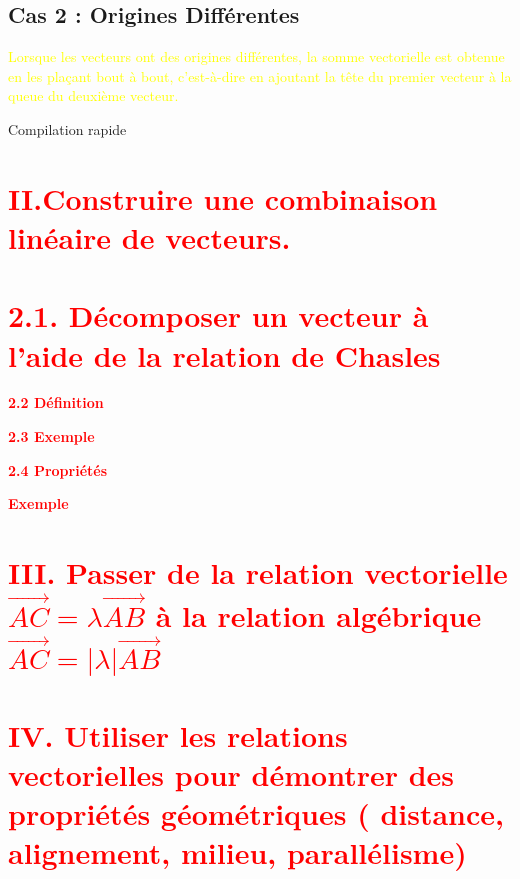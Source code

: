 \documentclass[12pt]{article}
\begin{document}
\subsection*{Cas 2 : Origines Différentes}

\textcolor{yellow}{Lorsque les vecteurs ont des origines différentes, la somme vectorielle est obtenue en les plaçant bout à bout, c'est-à-dire en ajoutant la tête du premier vecteur à la queue du deuxième vecteur.}
\begin{center}
Compilation rapide
\end{center}
\begin{center}
\end{center}
\section*{\textcolor{red}{\textbf{II.Construire une combinaison linéaire de vecteurs.}}}
\section*{\textcolor{red}{\textbf{2.1. Décomposer un vecteur à l’aide de la relation de Chasles}}}

\textcolor{red}{\textbf{2.2 Définition}}

\textcolor{red}{\textbf{2.3 Exemple}}

\textcolor{red}{\textbf{2.4 Propriétés}}

\textcolor{red}{\textbf{Exemple}}

\section*{\textcolor{red}{\textbf{III. Passer de la relation vectorielle $\vec{AC}=\lambda \vec{AB}$ à la relation algébrique $\vec{AC}=|\lambda|\vec{AB}$}}}
\section*{\textcolor{red}{\textbf{IV. Utiliser les relations vectorielles pour démontrer des propriétés géométriques
( distance, alignement, milieu, parallélisme)}}}
\end{document}
